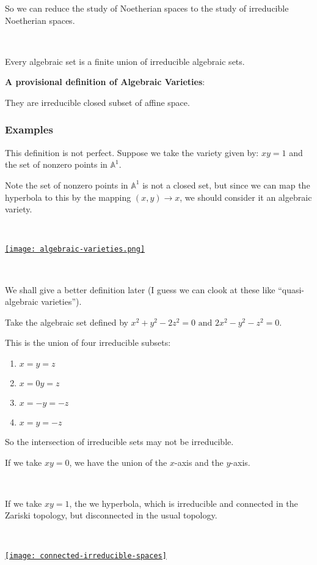 So we can reduce the study of Noetherian spaces to the study of irreducible Noetherian spaces.


\

\begin{corollary}
    Every algebraic set is a finite union of irreducible algebraic sets.
\end{corollary}

\begin{definition}
    \textbf{A provisional definition of Algebraic Varieties}:
    
    They are irreducible closed subset of affine space.
\end{definition}

\subsubsection{Examples}

\begin{example}
  This definition is not perfect. Suppose we take the variety given by: $xy=1$ and the set of nonzero points in $\mathbb{A}^1$.

Note the set of nonzero points in $\mathbb{A}^1$ is not a closed set, but since we can map the hyperbola to this by the mapping $(x,y)\rightarrow x$, we should consider it an algebraic variety.

\

\href{https://youtu.be/D_eJ8BWLb24?t=1110}{\texttt{[image: algebraic-varieties.png]}}

\

We shall give a better definition later (I guess we can clook at these like ``quasi-algebraic varieties'').
\end{example}

\begin{example}
    Take the algebraic set defined by $x^2+y^2 - 2z^2 = 0 \text{ and }2x^2-y^2-z^2 = 0$.

    This is the union of four irreducible subsets:\begin{enumerate}
        \item $x=y=z$
        \item $x=0y=z$
        \item $x=-y=-z$
        \item $x=y=-z$
    \end{enumerate}

    So the intersection of irreducible sets may not be irreducible.
\end{example}
\newpage 
\begin{example}
    If we take $xy=0$, we have the union of the $x$-axis and the $y$-axis.

    \

    If we take $xy=1$, the we hyperbola, which is irreducible and connected in the Zariski topology, but disconnected in the usual topology.

    \

\href{https://youtu.be/D_eJ8BWLb24?t=1295}{\texttt{[image: connected-irreducible-spaces]}}

\end{example}

